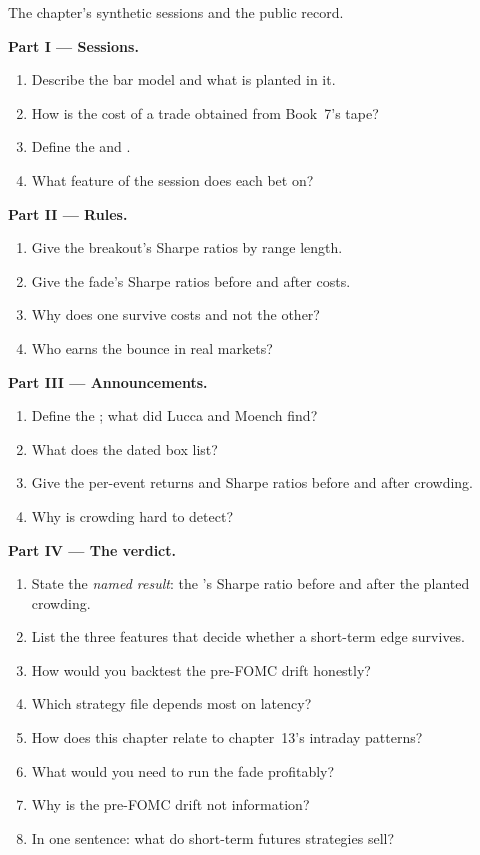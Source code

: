 \begin{problem}\label{pb:s1:short-term-futures-strategies:1}
The chapter's synthetic sessions and the public record.

\medskip\noindent\textbf{Part I --- Sessions.}
\begin{enumerate}
\item Describe the bar model and what is planted in it.
\item How is the cost of a trade obtained from Book~7's tape?
\item Define the  and .
\item What feature of the session does each bet on?
\end{enumerate}

\medskip\noindent\textbf{Part II --- Rules.}
\begin{enumerate}[resume]
\item Give the breakout's Sharpe ratios by range length.
\item Give the fade's Sharpe ratios before and after costs.
\item Why does one survive costs and not the other?
\item Who earns the bounce in real markets?
\end{enumerate}

\medskip\noindent\textbf{Part III --- Announcements.}
\begin{enumerate}[resume]
\item Define the ; what did Lucca and Moench find?
\item What does the dated box list?
\item Give the per-event returns and Sharpe ratios before and after crowding.
\item Why is crowding hard to detect?
\end{enumerate}

\medskip\noindent\textbf{Part IV --- The verdict.}
\begin{enumerate}[resume]
\item State the \emph{named result}: the 's Sharpe ratio before and after the planted crowding.
\item List the three features that decide whether a short-term edge survives.
\item How would you backtest the pre-FOMC drift honestly?
\item Which strategy file depends most on latency?
\item How does this chapter relate to chapter~13's intraday patterns?
\item What would you need to run the fade profitably?
\item Why is the pre-FOMC drift not information?
\item In one sentence: what do short-term futures strategies sell?
\end{enumerate}
\end{problem}

